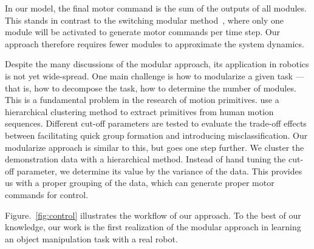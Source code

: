 In our model, the final motor command is the sum of the outputs of all
modules. This stands in contrast to the switching modular
method~\citep{narendra1997adaptive}, where only one module will be
activated to generate motor commands per time step.  Our approach therefore
requires fewer modules to approximate the system dynamics.

Despite the many discussions of the modular approach, its application
in robotics is not yet wide-spread. One main challenge is how to
modularize a given task --- that is, how to decompose the task,
how to determine the number of modules. This is a
fundamental problem in the research of motion
primitives. \citet{kulic2008incremental} use a hierarchical clustering
method to extract primitives from human motion sequences. Different
cut-off parameters are tested to evaluate the trade-off effects
between facilitating quick group formation and introducing
misclassification. Our modularize approach is similar to this, but
goes one step further. We cluster the demonstration data with a
hierarchical method. Instead of
hand tuning the cut-off parameter, we determine its value by the
variance of the data. This provides us with a proper grouping of the
data, which can generate proper motor commands for control.

Figure.~\ref{fig:control} illustrates the workflow of our approach. To
the best of our knowledge, our work is the first realization of the
modular approach in learning an object manipulation task with a real
robot.





%
%
%

